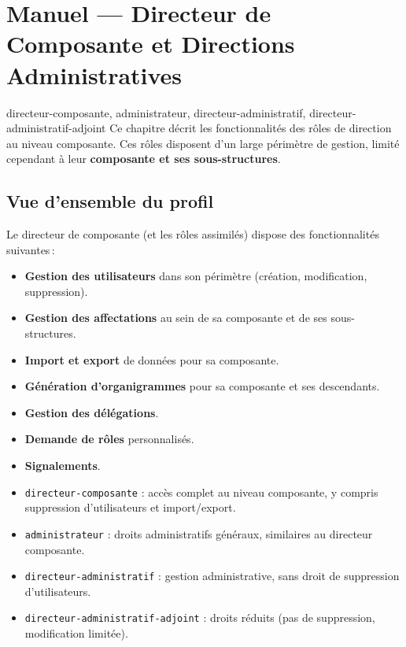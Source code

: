 \chapter{Manuel --- Directeur de Composante et Directions Administratives}
\label{chap:dircomp}

\begin{rolebox}{directeur-composante, administrateur, directeur-administratif, directeur-administratif-adjoint}
  Ce chapitre d\'ecrit les fonctionnalit\'es des r\^oles de direction au niveau composante. Ces r\^oles disposent d'un large p\'erim\`etre de gestion, limit\'e cependant \`a leur \textbf{composante et ses sous-structures}.
\end{rolebox}

\section{Vue d'ensemble du profil}

Le directeur de composante (et les r\^oles assimil\'es) dispose des fonctionnalit\'es suivantes\,:

\begin{itemize}
  \item \textbf{Gestion des utilisateurs} dans son p\'erim\`etre (cr\'eation, modification, suppression).
  \item \textbf{Gestion des affectations} au sein de sa composante et de ses sous-structures.
  \item \textbf{Import et export} de donn\'ees pour sa composante.
  \item \textbf{G\'en\'eration d'organigrammes} pour sa composante et ses descendants.
  \item \textbf{Gestion des d\'el\'egations}.
  \item \textbf{Demande de r\^oles} personnalis\'es.
  \item \textbf{Signalements}.
\end{itemize}

\begin{notebox}
  \begin{itemize}
    \item \texttt{directeur-composante} : acc\`es complet au niveau composante, y compris suppression d'utilisateurs et import/export.
    \item \texttt{administrateur} : droits administratifs g\'en\'eraux, similaires au directeur composante.
    \item \texttt{directeur-administratif} : gestion administrative, sans droit de suppression d'utilisateurs.
    \item \texttt{directeur-administratif-adjoint} : droits r\'eduits (pas de suppression, modification limit\'ee).
  \end{itemize}
\end{notebox}

